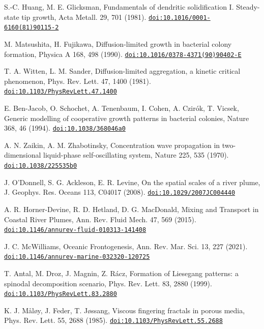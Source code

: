 \documentclass[11pt,a4paper]{article}
\begin{document}
\begin{description}[leftmargin=2.6em,labelwidth=2.2em,labelsep=0.4em,itemsep=1pt,parsep=0pt,font=\normalfont]
\item[{[40]}] S.-C. Huang, M. E. Glicksman, Fundamentals of dendritic solidification I. Steady-state tip growth, Acta Metall. 29, 701 (1981). \href{https://doi.org/10.1016/0001-6160(81)90115-2}{\nolinkurl{doi:10.1016/0001-6160(81)90115-2}}
\item[{[41]}] M. Matsushita, H. Fujikawa, Diffusion-limited growth in bacterial colony formation, Physica A 168, 498 (1990). \href{https://doi.org/10.1016/0378-4371(90)90402-E}{\nolinkurl{doi:10.1016/0378-4371(90)90402-E}}
\item[{[42]}] T. A. Witten, L. M. Sander, Diffusion-limited aggregation, a kinetic critical phenomenon, Phys. Rev. Lett. 47, 1400 (1981). \href{https://doi.org/10.1103/PhysRevLett.47.1400}{\nolinkurl{doi:10.1103/PhysRevLett.47.1400}}
\item[{[43]}] E. Ben-Jacob, O. Schochet, A. Tenenbaum, I. Cohen, A. Czirók, T. Vicsek, Generic modelling of cooperative growth patterns in bacterial colonies, Nature 368, 46 (1994). \href{https://doi.org/10.1038/368046a0}{\nolinkurl{doi:10.1038/368046a0}}
\item[{[44]}] A. N. Zaikin, A. M. Zhabotinsky, Concentration wave propagation in two-dimensional liquid-phase self-oscillating system, Nature 225, 535 (1970). \href{https://doi.org/10.1038/225535b0}{\nolinkurl{doi:10.1038/225535b0}}
\item[{[45]}] J. O’Donnell, S. G. Ackleson, E. R. Levine, On the spatial scales of a river plume, J. Geophys. Res. Oceans 113, C04017 (2008). \href{https://doi.org/10.1029/2007JC004440}{\nolinkurl{doi:10.1029/2007JC004440}}
\item[{[46]}] A. R. Horner-Devine, R. D. Hetland, D. G. MacDonald, Mixing and Transport in Coastal River Plumes, Ann. Rev. Fluid Mech. 47, 569 (2015). \href{https://doi.org/10.1146/annurev-fluid-010313-141408}{\nolinkurl{doi:10.1146/annurev-fluid-010313-141408}}
\item[{[47]}] J. C. McWilliams, Oceanic Frontogenesis, Ann. Rev. Mar. Sci. 13, 227 (2021). \href{https://doi.org/10.1146/annurev-marine-032320-120725}{\nolinkurl{doi:10.1146/annurev-marine-032320-120725}}
\item[{[48]}] T. Antal, M. Droz, J. Magnin, Z. Rácz, Formation of Liesegang patterns: a spinodal decomposition scenario, Phys. Rev. Lett. 83, 2880 (1999). \href{https://doi.org/10.1103/PhysRevLett.83.2880}{\nolinkurl{doi:10.1103/PhysRevLett.83.2880}}
\item[{[49]}] K. J. Måløy, J. Feder, T. Jøssang, Viscous fingering fractals in porous media, Phys. Rev. Lett. 55, 2688 (1985). \href{https://doi.org/10.1103/PhysRevLett.55.2688}{\nolinkurl{doi:10.1103/PhysRevLett.55.2688}}

\end{description}
\end{document}
